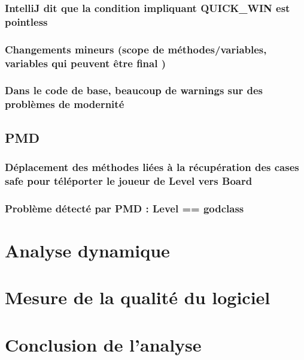 \documentclass[12pt, openany]{report}
\begin{document}
\subsubsection{IntelliJ dit que la condition impliquant QUICK\_WIN est \og pointless \fg} 
\subsubsection{Changements mineurs (\og scope \fg de méthodes/variables, variables qui peuvent être \og final \fg)}
\subsubsection{Dans le code de base, beaucoup de \og warnings \fg sur des \og problèmes de modernité \fg}

\subsection{PMD}
\subsubsection{Déplacement des méthodes liées à la récupération des cases \og safe \fg pour téléporter le joueur de Level vers Board}
\subsubsection{Problème détecté par PMD : Level == godclass}


\section{Analyse dynamique}
\section{Mesure de la qualité du logiciel}
\section{Conclusion de l'analyse}





%
%
\end{document}
